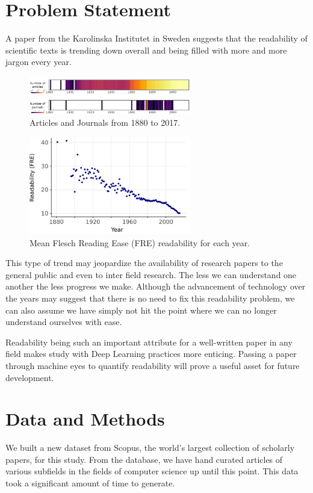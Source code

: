 \documentclass[conference]{IEEEtran}
\begin{document}
\section{Problem Statement}
A paper from the Karolinska Institutet in Sweden suggests that the readability of scientific texts is trending down overall and being filled with more and more jargon every year\cite{b12}.

\begin{figure}[htbp]
\centerline{\includegraphics[width=200pt]{images/articles_up.png}}
\caption{Articles and Journals from 1880 to 2017\cite{b12}.}
\label{articles_up}
\end{figure}

\begin{figure}[htbp]
\centerline{\includegraphics[width=200pt]{images/read_down.png}}
\caption{Mean Flesch Reading Ease (FRE) readability for each year\cite{b12}.}
\label{readability_down}
\end{figure}

\par
This type of trend may jeopardize the availability of research papers to the general public and even to inter field research. The less we can understand one another the less progress we make. Although the advancement of technology over the years may suggest that there is no need to fix this readability problem, we can also assume we have simply not hit the point where we can no longer understand ourselves with ease.
\par
Readability being such an important attribute for a well-written paper in any field makes study with Deep Learning practices more enticing. Passing a paper through machine eyes to quantify readability will prove a useful asset for future development.

\section{Data and Methods}
We built a new dataset from Scopus, the world's largest collection of scholarly papers, for this study. From the database, we have hand curated articles of various subfields in the fields of computer science up until this point. This data took a significant amount of time to generate.
\end{document}
